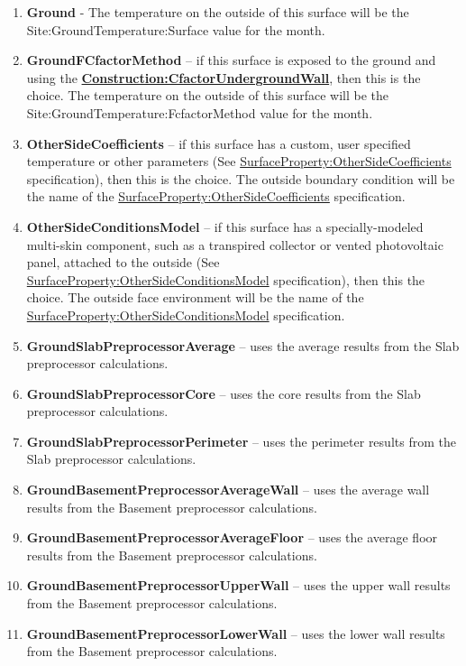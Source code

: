 \begin{enumerate}
  \item
    \textbf{Ground} - The temperature on the outside of this surface will be the Site:GroundTemperature:Surface value for the month.
  \item
    \textbf{GroundFCfactorMethod} -- if this surface is exposed to the ground and using the \textbf{\hyperref[constructioncfactorundergroundwall]{Construction:CfactorUndergroundWall}}, then this is the choice. The temperature on the outside of this surface will be the Site:GroundTemperature:FcfactorMethod value for the month.
  \item
    \textbf{OtherSideCoefficients} -- if this surface has a custom, user specified temperature or other parameters (See \hyperref[surfacepropertyothersidecoefficients]{SurfaceProperty:OtherSideCoefficients} specification), then this is the choice. The outside boundary condition will be the name of the \hyperref[surfacepropertyothersidecoefficients]{SurfaceProperty:OtherSideCoefficients} specification.
  \item
    \textbf{OtherSideConditionsModel} -- if this surface has a specially-modeled multi-skin component, such as a transpired collector or vented photovoltaic panel, attached to the outside (See \hyperref[surfacepropertyothersideconditionsmodel]{SurfaceProperty:OtherSideConditionsModel} specification), then this the choice. The outside face environment will be the name of the \hyperref[surfacepropertyothersideconditionsmodel]{SurfaceProperty:OtherSideConditionsModel} specification.
  \item
    \textbf{GroundSlabPreprocessorAverage} -- uses the average results from the Slab preprocessor calculations.
  \item
    \textbf{GroundSlabPreprocessorCore} -- uses the core results from the Slab preprocessor calculations.
  \item
    \textbf{GroundSlabPreprocessorPerimeter} -- uses the perimeter results from the Slab preprocessor calculations.
  \item
    \textbf{GroundBasementPreprocessorAverageWall} -- uses the average wall results from the Basement preprocessor calculations.
  \item
    \textbf{GroundBasementPreprocessorAverageFloor} -- uses the average floor results from the Basement preprocessor calculations.
  \item
    \textbf{GroundBasementPreprocessorUpperWall} -- uses the upper wall results from the Basement preprocessor calculations.
  \item
    \textbf{GroundBasementPreprocessorLowerWall} -- uses the lower wall results from the Basement preprocessor calculations.
\end{enumerate}

